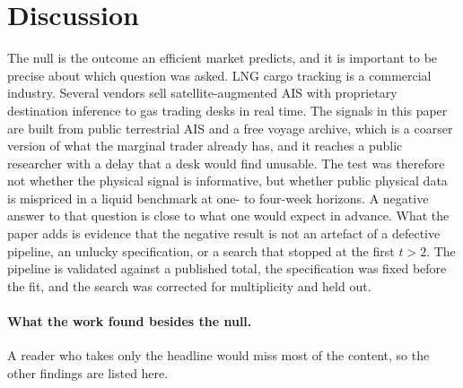 \section{Discussion}\label{sec:discussion}

The null is the outcome an efficient market predicts, and it is important to be
precise about which question was asked. LNG cargo tracking is a commercial industry.
Several vendors sell satellite-augmented AIS with proprietary destination inference
to gas trading desks in real time. The signals in this paper are built from public
terrestrial AIS and a free voyage archive, which is a coarser version of what the
marginal trader already has, and it reaches a public researcher with a delay that a
desk would find unusable. The test was therefore not whether the physical signal is
informative, but whether public physical data is mispriced in a liquid benchmark at
one- to four-week horizons. A negative answer to that question is close to what one
would expect in advance. What the paper adds is evidence that the negative result is
not an artefact of a defective pipeline, an unlucky specification, or a search that
stopped at the first $t>2$. The pipeline is validated against a published total,
the specification was fixed before the fit, and the search was corrected for
multiplicity and held out.

\paragraph{What the work found besides the null.} A reader who takes only the
headline would miss most of the content, so the other findings are listed here.

